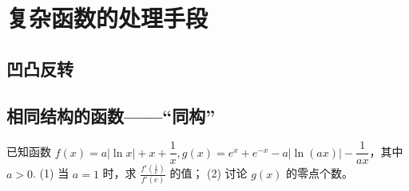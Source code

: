 \section{复杂函数的处理手段}
\subsection{凹凸反转}
\clearpage
\subsection{相同结构的函数——“同构”}

\begin{example}[2022年武汉二调]
    已知函数 $f(x) = a|\ln x| + x + \dfrac{1}{x}, g(x) = e^x + e^{-x} - a|\ln(ax)| - \dfrac{1}{ax}$，其中 $a > 0$.
        (1) 当 $a = 1$ 时，求 $\frac{f'\left(\frac{1}{e}\right)}{f'(e)}$ 的值；
        (2) 讨论 $g(x)$ 的零点个数。
\end{example}
